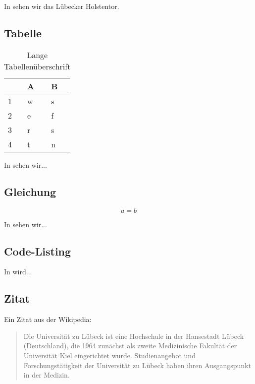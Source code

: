 \documentclass[
	ngerman,
	11pt,
	twoside,
	a4paper,
	headsepline,
	footsepline, 
	toc=bib
]{scrbook}
\begin{document}
In  sehen wir das  Lübecker Holstentor.

\subsection{Tabelle}

\begin{table}
\centering
\footnotesize
\caption[Kurze Tabellenüberschrift]{Lange Tabellenüberschrift}
\label{tab:eins}
\begin{tabular}{p{1.4cm} p{2.0cm} p{2.0cm}}\toprule
			& A 			& B 		\\[0.1cm]\midrule
	1		& w				& s 		\\[0.2cm]
	2 		& e				& f			\\[0.2cm]
	3		& r				& s			\\[0.2cm]
	4 		& t				& n 		\\\bottomrule
\end{tabular}
\end{table}

In  sehen wir...

\subsection{Gleichung}

\begin{equation}\label{eq:test}
  a=b
\end{equation}

In  sehen wir...

\subsection{Code-Listing}




In  wird...

\subsection{Zitat}

Ein Zitat aus der Wikipedia:

\begin{quote}
	\begin{myquote}
		Die Universität zu Lübeck ist eine Hochschule in der Hansestadt Lübeck (Deutschland), die 1964 zunächst als zweite Medizinische Fakultät der Universität Kiel eingerichtet wurde. Studienangebot und Forschungstätigkeit der Universität zu Lübeck haben ihren Ausgangspunkt in der Medizin.
		\label{quote:uni}
	\end{myquote}
\end{quote}
\end{document}
